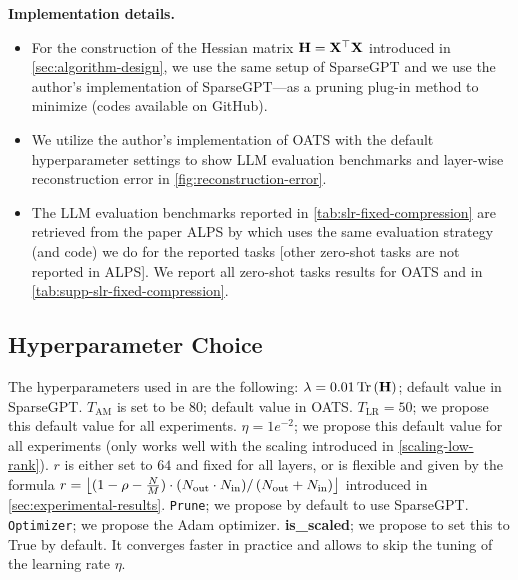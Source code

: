 \textbf{Implementation details.}
\begin{itemize}
    \item For the construction of the Hessian matrix $\mathbf{H} = \mathbf{X}^\top\mathbf{X}$ introduced in \cref{sec:algorithm-design}, we use the same setup of SparseGPT \cite{frantar2023sparsegpt} and we use the author's implementation of SparseGPT---as a pruning plug-in method to minimize \Pone (codes available on GitHub).
    \item We utilize the author's implementation of OATS \cite{zhang2024oats} with the default hyperparameter settings to show LLM evaluation benchmarks and layer-wise reconstruction error in \cref{fig:reconstruction-error}.
    \item The LLM evaluation benchmarks reported in \cref{tab:slr-fixed-compression} are retrieved from the paper ALPS by \citet{meng2024alps} which uses the same evaluation strategy (and code) we do for the reported tasks [other zero-shot tasks are not reported in ALPS]. We report all zero-shot tasks results for OATS and \ourframework in \cref{tab:supp-slr-fixed-compression}.
\end{itemize}



\subsection{Hyperparameter Choice}
The hyperparameters used in \ourframework are the following: $\lambda = 0.01 \operatorname{Tr}\left({\mathbf{H}}\right)$; default value in SparseGPT. $T_\text{AM}$ is set to be 80; default value in OATS. $T_\text{LR} = 50$; we propose this default value for all experiments. $\eta = 1e^{-2}$; we propose this default value for all experiments (only works well with the scaling introduced in \cref{scaling-low-rank}). $r$ is either set to $64$ and fixed for all layers, or is flexible and given by the formula $r = \left\lfloor {(1 - \rho - \frac{N}{M}) \cdot(N_{\text{out}}\cdot N_{\text{in}})} / \left({N_{\text{out}} + N_{\text{in}}}\right) \right\rfloor$ introduced in \cref{sec:experimental-results}. \texttt{Prune}; we propose by default to use SparseGPT. \texttt{Optimizer}; we propose the Adam optimizer. \textbf{is\_scaled}; we propose to set this to True by default. It converges faster in practice and allows to skip the tuning of the learning rate $\eta$.

